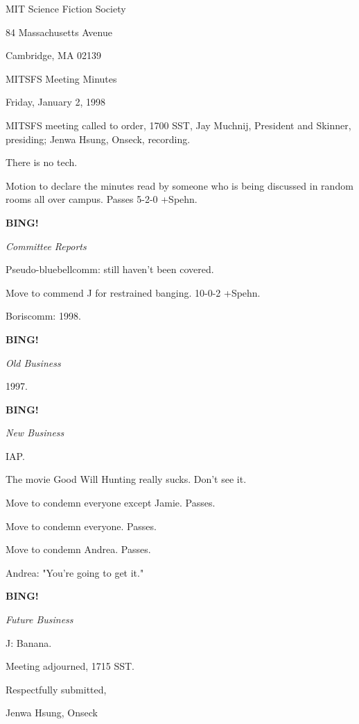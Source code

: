 \documentclass[12pt]{article}
\newcommand{\bing}{{\bf BING!} }
\newcommand{\goto}[1]{\bing \vskip 12pt \centerline{{\em{#1}}}}
\begin{document}
\begin{center}

MIT Science Fiction Society 

84 Massachusetts Avenue

Cambridge, MA 02139

\vspace{12pt}

MITSFS Meeting Minutes 

Friday, January 2, 1998

\end{center}
 
\vspace{18pt}

\setlength{\parskip}{6pt}

\noindent
MITSFS meeting called to order, 1700 SST,
Jay Muchnij, President and Skinner, presiding; Jenwa Hsung, Onseck, recording.

There is no tech.

Motion to declare the minutes read by someone who is being discussed in random rooms all over campus. Passes 5-2-0 +Spehn.

\goto{Committee Reports}

Pseudo-bluebellcomm: still haven't been covered.

Move to commend J for restrained banging. 10-0-2 +Spehn.

Boriscomm: 1998.

\goto{Old Business}

1997.

\goto{New Business}

IAP.

The movie Good Will Hunting really sucks. Don't see it.

Move to condemn everyone except Jamie. Passes.

Move to condemn everyone. Passes.

Move to condemn Andrea. Passes.

Andrea: "You're going to get it."

\goto{Future Business}

J: Banana.

\vspace{12pt}

\noindent
Meeting adjourned, 1715 SST.

\vspace{18pt}

\centerline{Respectfully submitted,}
\centerline{Jenwa Hsung, Onseck}
\end{document}
